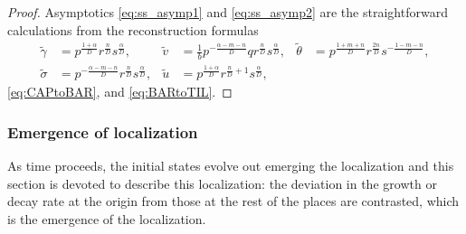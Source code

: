 \documentclass[a4paper,11pt]{article}
\def\tg{{\tilde{\gamma}}}
\def\tv{{\tilde{v}}}
\def\tth{{\tilde{\theta}}}
\def\ts{{\tilde{\sigma}}}
\def\tu{{\tilde{u}}}
\theoremstyle{remark}
\begin{document}
\begin{proof}
Asymptotics \eqref{eq:ss_asymp1} and \eqref{eq:ss_asymp2} are the straightforward calculations from the reconstruction formulas
\begin{align*}
 \tg&=p^{\frac{1+\alpha}{D}}r^{\frac{n}{D}}s^{\frac{\alpha}{D}}, & \tv &= \frac{1}{b} p^{-\frac{\alpha-m-n}{D}}qr^{\frac{n}{D}}s^{\frac{\alpha}{D}}, & \tth&=p^{\frac{1+m+n}{D}}r^{\frac{2n}{D}}s^{-\frac{1-m-n}{D}}, \\ \ts&=p^{-\frac{\alpha-m-n}{D}}r^{\frac{n}{D}}s^{\frac{\alpha}{D}},  & \tu&=p^{\frac{1+\alpha}{D}}r^{\frac{n}{D}+1}s^{\frac{\alpha}{D}},
\end{align*}
\eqref{eq:CAPtoBAR}, and \eqref{eq:BARtoTIL}.
%
%
%
\end{proof}

\subsubsection{Emergence of localization}
As time proceeds, the initial states evolve out emerging the localization and this section is devoted to describe this localization: the deviation in the growth or decay rate at the origin from those at the rest of the places are contrasted, which is the emergence of the localization.
\end{document}
